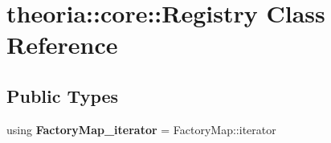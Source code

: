 \hypertarget{classtheoria_1_1core_1_1Registry}{}\section{theoria\+:\+:core\+:\+:Registry Class Reference}
\label{classtheoria_1_1core_1_1Registry}
\subsection*{Public Types}
\begin{DoxyCompactItemize}
\item 
\mbox{\label{classtheoria_1_1core_1_1Registry_ae131721f32d396fad4d2d48b0438dca1}} 
using {\bfseries Factory\+Map\+\_\+iterator} = Factory\+Map\+::iterator
\end{DoxyCompactItemize}
